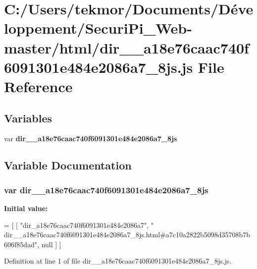 \section{C\+:/\+Users/tekmor/\+Documents/\+Développement/\+Securi\+Pi\+\_\+\+Web-\/master/html/dir\+\_\+\+\_\+a18e76caac740f6091301e484e2086a7\+\_\+8js.js File Reference}
\label{dir____a18e76caac740f6091301e484e2086a7__8js_8js}
\subsection*{Variables}
\begin{DoxyCompactItemize}
\item 
var {\bf dir\+\_\+\+\_\+a18e76caac740f6091301e484e2086a7\+\_\+8js}
\end{DoxyCompactItemize}


\subsection{Variable Documentation}
\subsubsection[{dir\+\_\+\+\_\+a18e76caac740f6091301e484e2086a7\+\_\+8js}]{\setlength{\rightskip}{0pt plus 5cm}var dir\+\_\+\+\_\+a18e76caac740f6091301e484e2086a7\+\_\+8js}\label{dir____a18e76caac740f6091301e484e2086a7__8js_8js_a01567357212498a64eb1b032c4d8754d}
{\bfseries Initial value\+:}
\begin{DoxyCode}
=
[
    [ \textcolor{stringliteral}{"dir\_a18e76caac740f6091301e484e2086a7"}, \textcolor{stringliteral}{"
      dir\_\_a18e76caac740f6091301e484e2086a7\_8js.html#a7c10a2822b5098d35708b7b606f85dad"}, null ]
]
\end{DoxyCode}


Definition at line 1 of file dir\+\_\+\+\_\+a18e76caac740f6091301e484e2086a7\+\_\+8js.\+js.

